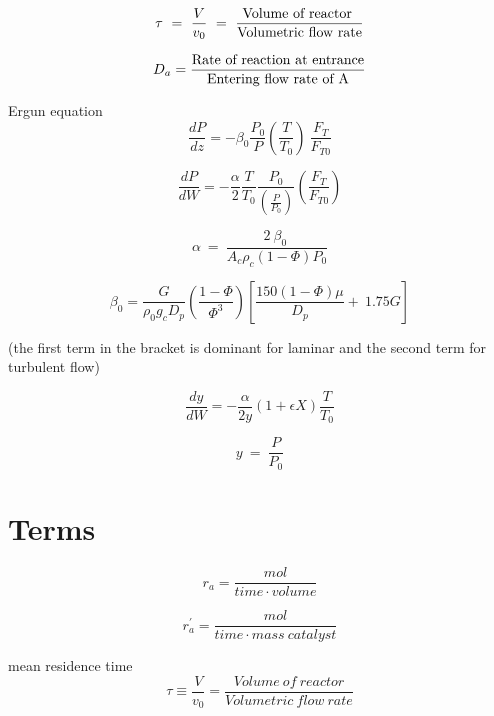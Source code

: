 \documentclass[8pt]{article}
\begin{document}
\[ \ \tau\ =\ \frac{V}{v_{0}} \ = \ \frac{\textnormal{Volume of reactor }}{\textnormal{Volumetric flow rate}}\ \] 
 
\[ \ D_a = \frac{\textnormal{Rate of reaction at entrance}}{ \textnormal{Entering flow rate of A} } \ \] 

Ergun equation 
\[ \frac{dP}{dz}=-\beta_{0}\frac{P_{0}}{P}\left(\frac{T}{T_{0}}\right)\ \frac{F_{T}}{F_{T0}} \]

\[ \frac{dP}{dW}=-\frac{\alpha}{2}\frac{T}{T_{0}}\frac{P_{0}}{\left(\frac{P}{P_{0}}\right)}\left(\frac{F_{T}}{F_{T0}}\right) \]

\[ \alpha\ =\ \frac{2\ \beta_{0}\ }{A_{c}\rho_{c}\left(1-\Phi\right)P_{0}} \]

\[ \beta_{0}=\frac{G}{\rho_{0}g_{c}D_{p}}\left(\frac{1-\Phi}{\Phi^{3}}\right)\left[\frac{150\left(1-\Phi\right)\mu}{D_{p}}+\ 1.75 G\right] \]

(the first term in the bracket is dominant for laminar and the second term for turbulent flow)

\[ \frac{dy}{dW}=-\frac{\alpha}{2y}\left(1+\epsilon X\right)\frac{T}{T_{0}}  \]

\[ y\ =\ \frac{P}{P_{0}} \] 














\clearpage
\section*{Terms}

\[ r_{a} =  \frac{mol}{time \cdot volume}  \label{rate} \tag{p6} \]




\[ r_{a}^{'}=\frac{mol}{time\cdot mass\ catalyst} \tag{p6} \]

mean residence time 
\[ \tau \equiv \frac{V}{v_0}  = \frac{ Volume \ of \ reactor }{ Volumetric \ flow \ rate} \]
\end{document}
